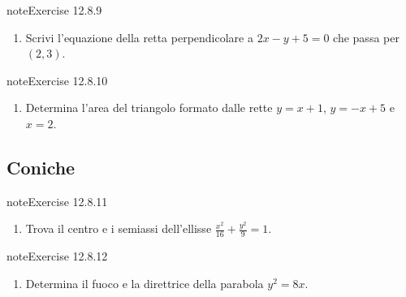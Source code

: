 \documentclass[letterpaper,10pt,italian]{jupyterBook}
\begin{document}
\begin{sphinxadmonition}{note}{Exercise 12.8.9}


\begin{enumerate}
%
\setcounter{enumi}{8}
\item {} 
\sphinxAtStartPar
Scrivi l’equazione della retta perpendicolare a \( 2x - y + 5 = 0 \) che passa per \( (2, 3) \).

\end{enumerate}
\end{sphinxadmonition}
 \label{exercise:ch/analytic_geometry/analytic_geometry_2d/sol-exercise-9}

\begin{sphinxadmonition}{note}{Exercise 12.8.10}


\begin{enumerate}
%
\setcounter{enumi}{9}
\item {} 
\sphinxAtStartPar
Determina l’area del triangolo formato dalle rette \( y = x + 1 \), \( y = -x + 5 \) e \( x = 2 \).

\end{enumerate}
\end{sphinxadmonition}


\subsection{Coniche}
\label{\detokenize{ch/analytic_geometry/analytic_geometry_2d/sol:coniche}} \label{exercise:ch/analytic_geometry/analytic_geometry_2d/sol-exercise-10}

\begin{sphinxadmonition}{note}{Exercise 12.8.11}


\begin{enumerate}
%
\setcounter{enumi}{10}
\item {} 
\sphinxAtStartPar
Trova il centro e i semiassi dell’ellisse \( \frac{x^2}{16} + \frac{y^2}{9} = 1 \).

\end{enumerate}
\end{sphinxadmonition}
 \label{exercise:ch/analytic_geometry/analytic_geometry_2d/sol-exercise-11}

\begin{sphinxadmonition}{note}{Exercise 12.8.12}


\begin{enumerate}
%
\setcounter{enumi}{11}
\item {} 
\sphinxAtStartPar
Determina il fuoco e la direttrice della parabola \( y^2 = 8x \).

\end{enumerate}
\end{sphinxadmonition}
 \label{exercise:ch/analytic_geometry/analytic_geometry_2d/sol-exercise-12}
\end{document}
